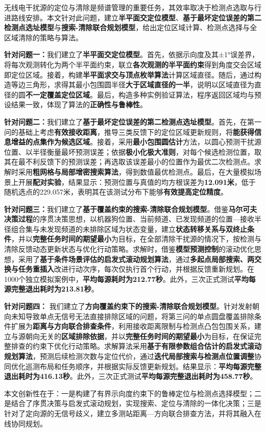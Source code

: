 无线电干扰源的定位与清除是频谱管理的重要任务，其效率取决于检测点选取与行进路线安排。本文针对此问题，建立\textbf{半平面交定位模型}、\textbf{基于最坏定位误差的第二检测点选址模型}与\textbf{搜索-清除联合规划模型}，给出定位区域计算、检测点选择与全区域清除的策略与算法。

\textbf{针对问题一：}我们建立了\textbf{半平面交定位模型}。首先，依据示向度及其±1°误差界，将每次观测转化为两个半平面约束，联立\textbf{各次观测的半平面约束}得到角度交会区域即定位区域。接着，构建\textbf{半平面求交与顶点枚举算法}计算区域直径。随后，通过构造等边三角形，求得其最小包围圆半径\textbf{大于区域直径的一半}，说明以区域直径为直径的圆\textbf{不一定覆盖定位区域}。最后，构造多种实例验证算法，程序返回区域均与预设结果一致，体现了算法的\textbf{正确性与鲁棒性}。

\textbf{针对问题二：}我们建立了\textbf{基于最坏定位误差的第二检测点选址模型}。首先，在第一问的基础上考虑\textbf{有效接收距离}，推导三类反馈下的定位区域更新规则，将\textbf{能获得信息增益的点集作为候选区域}。接着，采用\textbf{最小包围圆估计}方法，以圆心预测干扰源位置、以半径衡量最坏预测误差；依据\textbf{极小化极大准则}，对每个候选检测位置，取其在最不利反馈下的预测误差；再选取该误差最小的位置作为最优二次检测点。求解时采用\textbf{粗网格与局部增密搜索算法}，得到数值最优检测点。最后，在大量模拟场景上开展\textbf{配对实验}，结果显示：预测位置与真值的均方根误差为\textbf{12.091米}，低于随机选点的229.057米，表明其在该测试分布下能够\textbf{有效提高定位精度}。

\textbf{针对问题三：}我们建立了\textbf{基于覆盖约束的搜索-清除联合规划模型}。借鉴\textbf{马尔可夫决策过程}的序贯决策思想，以机器狗位置、当前频道、已发现频道的位置—接收半径组合集与未发现频道的未排除区域为状态变量，建立\textbf{状态转移关系与双终止条件}，并以\textbf{完整任务时间的期望最小}为目标，在全部清除干扰源的情况下，按检测与清除反馈动态更新状态与优化行动策略。求解时，借鉴\textbf{模型预测控制}的滚动优化思想，采用了\textbf{基于条件场景评估的启发式滚动规划算法}，通过\textbf{多起点局部搜索、两交换与任务重插入}改进行动次序，每次仅执行首个行动，并根据反馈重新规划。在1000个独立模拟案例中，\textbf{平均每源耗时为212.77秒}。此外，三次正式测试\textbf{平均每源完整退出耗时为213.81秒}。

\textbf{针对问题四：} 我们建立了\textbf{方向覆盖约束下的搜索-清除联合规划模型}。针对发射朝向未知导致单点无信号无法直接排除区域的问题，将第三问的单点圆盘覆盖排除条件扩展为\textbf{距离与方向联合排查条件}，利用接收距离限制与检测点凸包包围关系，建立与源朝向无关的\textbf{区域排除依据}，并以\textbf{完整任务时间的期望最小}为目标，在保证完整排查的约束下优化行动策略。求解算法采用\textbf{基于有限参数组合估计的启发式滚动规划算法}，预测后续检测次数与定位代价，通过\textbf{迭代局部搜索与检测点位置调整}协同优化巡测布局和任务顺序，并根据实际反馈更新规划。结果显示：\textbf{平均每源完整退出耗时为416.13秒}。此外，三次正式测试\textbf{平均每源完整退出耗时为458.77秒}。

本文创新性在于：一是构建了有界示向度约束下的鲁棒定位与检测点选择模型；二是结合了序贯决策与启发式滚动规划，实现搜索、定位与清除的一体化决策；三是针对了定向源的无信号歧义，建立多测站距离—方向联合排查方法，并将其融入在线协同规划。
